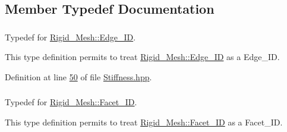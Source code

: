 \subsection{Member Typedef Documentation}
\subsubsection[{\texorpdfstring{Edge\+\_\+\+ID}{Edge_ID}}]{\hspace{0.3cm}{\ttfamily [private]}}\hypertarget{classFVCode3D_1_1StiffMatrix_ac82be26370aa6eb17714078d9a2bf8df}{}\label{classFVCode3D_1_1StiffMatrix_ac82be26370aa6eb17714078d9a2bf8df}


Typedef for \hyperlink{classFVCode3D_1_1Rigid__Mesh_1_1Edge__ID}{Rigid\+\_\+\+Mesh\+::\+Edge\+\_\+\+ID}. 

This type definition permits to treat \hyperlink{classFVCode3D_1_1Rigid__Mesh_1_1Edge__ID}{Rigid\+\_\+\+Mesh\+::\+Edge\+\_\+\+ID} as a Edge\+\_\+\+ID. 

Definition at line \hyperlink{Stiffness_8hpp_source_l00050}{50} of file \hyperlink{Stiffness_8hpp_source}{Stiffness.\+hpp}.

\subsubsection[{\texorpdfstring{Facet\+\_\+\+ID}{Facet_ID}}]{\hspace{0.3cm}{\ttfamily [private]}}\hypertarget{classFVCode3D_1_1StiffMatrix_a317efdb4e4f2da856c747d1e0b80db20}{}\label{classFVCode3D_1_1StiffMatrix_a317efdb4e4f2da856c747d1e0b80db20}


Typedef for \hyperlink{classFVCode3D_1_1Rigid__Mesh_1_1Facet__ID}{Rigid\+\_\+\+Mesh\+::\+Facet\+\_\+\+ID}. 

This type definition permits to treat \hyperlink{classFVCode3D_1_1Rigid__Mesh_1_1Facet__ID}{Rigid\+\_\+\+Mesh\+::\+Facet\+\_\+\+ID} as a Facet\+\_\+\+ID. 

